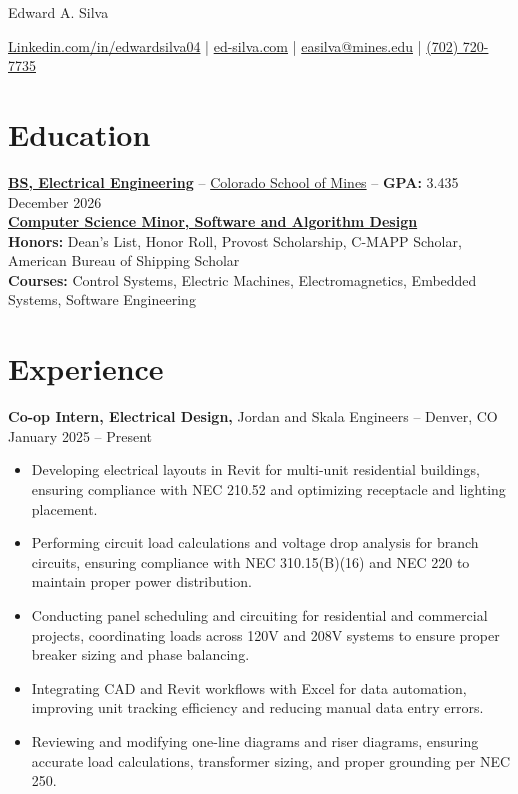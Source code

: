 \documentclass[11pt]{article}       %
\begin{document}
\centerline{\huge Edward A. Silva}
\vspace{5pt}

\centerline{
\href{https://www.linkedin.com/in/edwardsilva04/}{Linkedin.com/in/edwardsilva04}
| \href{https://ed-silva.com}{ed-silva.com}
| \href{mailto:easilva@mines.edu}{easilva@mines.edu} 
| \href{tel:7027207735}{(702) 720-7735}
}

\vspace{-18pt}
\section*{Education}
\textbf{\href{https://electrical.mines.edu/undergraduate-program/}{BS, Electrical Engineering}} -- \href{https://www.mines.edu/}{Colorado School of Mines} -- \textbf{GPA:} 3.435 \hfill December 2026 \\
\textbf{\href{https://cs.mines.edu/csmines-minors-and-areas-of-special-interest/}{Computer Science Minor, Software and Algorithm Design}}\\

\textbf{Honors:} Dean's List, Honor Roll, Provost Scholarship, C-MAPP Scholar, American Bureau of Shipping Scholar \\ 
\textbf{Courses:} Control Systems, Electric Machines, Electromagnetics, Embedded Systems, Software Engineering
\vspace{-14pt}

\section*{Experience}

\textbf{Co-op Intern, Electrical Design, }{Jordan and Skala Engineers} -- Denver, CO \hfill January 2025 -- Present \\
\vspace{-6.5pt}
\begin{itemize}
  \item Developing electrical layouts in Revit for multi-unit residential buildings, ensuring compliance with NEC 210.52 and optimizing receptacle and lighting placement.
  \item Performing circuit load calculations and voltage drop analysis for branch circuits, ensuring compliance with NEC 310.15(B)(16) and NEC 220 to maintain proper power distribution.
  \item Conducting panel scheduling and circuiting for residential and commercial projects, coordinating loads across 120V and 208V systems to ensure proper breaker sizing and phase balancing.
  \item Integrating CAD and Revit workflows with Excel for data automation, improving unit tracking efficiency and reducing manual data entry errors.
  \item Reviewing and modifying one-line diagrams and riser diagrams, ensuring accurate load calculations, transformer sizing, and proper grounding per NEC 250.
\end{itemize}
\end{document}

